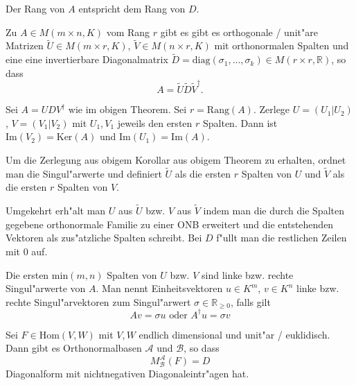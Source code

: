 \documentclass[8pt, a4paper, twocolumn, landscape]{article}
\begin{document}
\begin{remark}
Der Rang von $A$ entspricht dem Rang von $D$.
\end{remark}


\begin{corollary}
Zu $A \in M(m \times n, K)$ vom Rang $r$ gibt es gibt es orthogonale  / unit"are Matrizen $\tilde{U} \in M(m \times r, K)$, $\tilde{V} \in M(n \times r, K)$ mit orthonormalen Spalten und eine eine invertierbare Diagonalmatrix $\tilde{D} = \mathrm{diag}(\sigma_1, ..., \sigma_k) \in M(r \times r, \mathbb{R})$, so dass 
$$
A = \tilde{U} \tilde{D} \tilde{V}^\dagger.
$$
\end{corollary}

\begin{remark}
Sei $A = U D V^\dagger$ wie im obigen Theorem. Sei $r = \mathrm{Rang}(A)$. Zerlege $U = \left(U_1 | U_2\right)$, $V = \left( V_1 | V_2\right)$ mit $U_1, V_1$ jeweils den ersten $r$ Spalten. Dann ist $\mathrm{Im}(V_2) = \mathrm{Ker}(A)$ und $\mathrm{Im}(U_1) = \mathrm{Im}(A).$
\end{remark}


\begin{remark}
Um die Zerlegung aus obigem Korollar aus obigem Theorem zu erhalten, ordnet man die Singul"arwerte und definiert $\tilde{U}$ als die ersten $r$ Spalten von $U$ und $\tilde{V}$ als die ersten $r$ Spalten von $V$.

Umgekehrt erh"alt man $U$ aus $\tilde{U}$ bzw. $V$ aus $\tilde{V}$ indem man die durch die Spalten gegebene orthonormale Familie zu einer ONB erweitert und die entstehenden Vektoren als zus"atzliche Spalten schreibt. Bei $D$ f"ullt man die restlichen Zeilen mit $0$ auf.
\end{remark}



\begin{definition}
Die ersten $\mathrm{min}(m, n)$ Spalten von $U$ bzw. $V$ sind linke bzw. rechte Singul"arwerte von $A$. Man nennt Einheitsvektoren $u \in K^m$, $v \in K^n$ linke bzw. rechte Singul"arvektoren zum Singul"arwert $\sigma \in \mathbb{R}_{\geq 0}$, falls gilt
$$
Av = \sigma u \text{ oder } A^\dagger u = \sigma v
$$
\end{definition}

\begin{corollary}
Sei $F \in \mathrm{Hom}(V, W)$ mit $V, W$ endlich dimensional und unit"ar / euklidisch. Dann gibt es Orthonormalbasen $\mathcal{A}$ und $\mathcal{B}$, so dass 
$$
M^\mathcal{A}_\mathcal{B}(F) = D
$$
Diagonalform mit nichtnegativen Diagonaleintr"agen hat.
\end{corollary}
\end{document}
